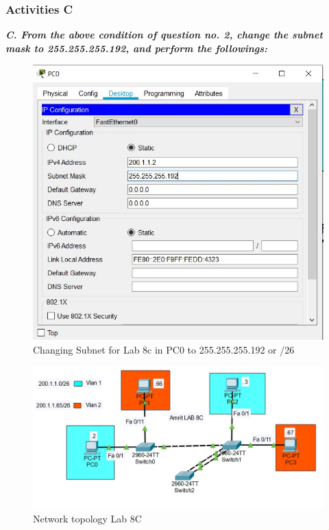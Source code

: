 \documentclass[a4paper,11pt]{article}
\begin{document}
\subsubsection{Activities C}

{\bfseries \textit{C. From the above condition of question no. 2, change the subnet mask to 255.255.255.192, and
        perform the followings:}}


\begin{figure}[H]
    \centering
    \includegraphics[scale=0.82,cframe=blue 0.5pt 3pt]{./FIG/C_SP0.jpg}
    \caption{Changing Subnet for Lab 8c in PC0 to 255.255.255.192 or /26 }
\end{figure}


\begin{figure}[H]
    \centering
    \includegraphics[scale=0.64,cframe=blue 0.5pt 3pt,width=\linewidth]{./FIG/Lab8C.jpg}
    \caption{Network topology Lab 8C}
\end{figure}
\end{document}
